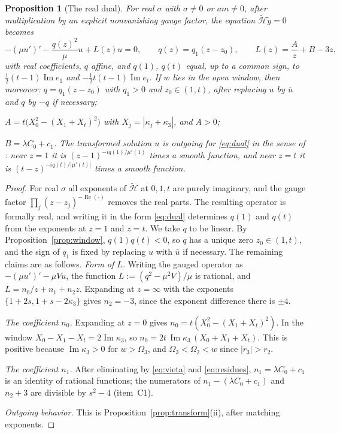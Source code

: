 \documentclass[11pt]{amsart}
\newtheorem{proposition}[theorem]{Proposition}
\theoremstyle{definition}
\theoremstyle{remark}
\numberwithin{equation}{section}
\renewcommand{\Im}{\operatorname{Im}}
\renewcommand{\Re}{\operatorname{Re}}
\begin{document}
\begin{proposition}[The real dual]\label{prop:dual}
For real $\sigma$ with $\sigma\ne0$ or $am\ne0$, after multiplication by an explicit nonvanishing gauge factor, the equation
$\widetilde{\mathcal H}\tilde y=0$ becomes
\begin{equation}\label{eq:dual}
-(\mu u')'-\frac{q(z)^2}{\mu}u+L(z)u=0,\qquad q(z)=q_1(z-z_0),\qquad L(z)=\frac{A}{z}+B-3z,
\end{equation}
with real coefficients, $q$ affine, and $q(1)$, $q(t)$ equal, up to a common sign, to
$\frac12(t-1)\Im e_1$ and $-\frac12t(t-1)\Im e_t$. If $w$ lies in the open window, then moreover:
$q=q_1(z-z_0)$ with $q_1>0$ and $z_0\in(1,t)$, after replacing $u$ by $\bar u$ and $q$ by $-q$ if necessary;

$A=t\big(X_0^2-(X_1+X_t)^2\big)$ with $X_j=|\kappa_j+\kappa_3|$, and $A>0$;

$B=\lambda C_0+c_1$.
The transformed solution $u$ is outgoing for \eqref{eq:dual} in the sense of \cite[(3.4)]{Hin26}: near $z=1$ it is
$(z-1)^{-iq(1)/\mu'(1)}$ times a smooth function, and near $z=t$ it is $(t-z)^{-iq(t)/|\mu'(t)|}$ times a smooth
function.
\end{proposition}

\begin{proof}
For real $\sigma$ all exponents of $\widetilde{\mathcal H}$ at $0,1,t$ are purely imaginary, and the gauge factor $\prod_j(z-z_j)^{-\Re(\cdot)}$ removes the
real parts. The resulting operator is formally real, and writing it in the form \eqref{eq:dual} determines $q(1)$ and
$q(t)$ from the exponents at $z=1$ and $z=t$. We take $q$ to be linear. By Proposition~\ref{prop:window},
$q(1)q(t)<0$, so $q$ has a unique zero $z_0\in(1,t)$, and the sign of $q_1$ is fixed by replacing $u$ with $\bar u$
if necessary. The remaining claims are as follows.
\emph{Form of $L$.} Writing the gauged operator as $-(\mu u')'-\mu Vu$, the function $L:=(q^2-\mu^2V)/\mu$ is rational, and $L=n_0/z+n_1+n_2z$. Expanding at
$z=\infty$ with the exponents $\{1+2s,1+s-2\kappa_3\}$ gives $n_2=-3$, since the exponent difference there is $\pm4$.

\emph{The coefficient $n_0$.} Expanding at $z=0$ gives $n_0=t(X_0^2-(X_1+X_t)^2)$. In the window
$X_0-X_1-X_t=2\Im\kappa_3$, so $n_0=2t\,\Im\kappa_3\,(X_0+X_1+X_t)$. This is positive because $\Im\kappa_3>0$ for
$w>\Omega_3$, and $\Omega_3<\Omega_2<w$ since $|r_3|>r_2$.

\emph{The coefficient $n_1$.} After eliminating by \eqref{eq:vieta} and \eqref{eq:residues}, $n_1=\lambda C_0+c_1$
is an identity of rational functions; the numerators of $n_1-(\lambda C_0+c_1)$ and $n_2+3$ are divisible by $s^2-4$
(item~C1).

\emph{Outgoing behavior.} This is Proposition~\ref{prop:transform}(ii), after matching exponents.
\end{proof}
\end{document}
